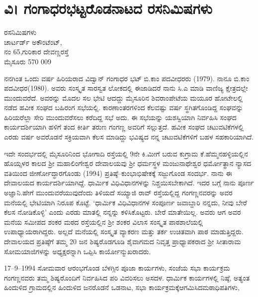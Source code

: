 \chapter{ವಿ। ಗಂಗಾಧರಭಟ್ಟರೊಡನಾಟದ ರಸನಿಮಿಷಗಳು} 

\begin{center}
\smallskip

ರಸನಿಮಿಷಗಳು\\
ಚಾರ್ಟರ್ಡ್ ಅಕೌಂಟೆಂಟ್,\\ 
ನಂ 65,ಗುರಿಕಾರ ದೇವಣ್ಣರಸ್ತೆ\\
ಮೈಸೂರು 570 009 
\addrule	
\end{center}

ನನಗಿಂತ ಒಂದು ವರ್ಷ ಹಿರಿಯರಾದ ವಿದ್ವಾನ್ ಗಂಗಾಧರ ಭಟ್ ಬಿ.ಕಾಂ ಪದವೀಧರರು (1979). ನಾನೂ ಬಿ.ಕಾಂ ಪದವೀಧರ(1980). ಅವರು ಸಂಸ್ಕೃತ ಸಾರಸ್ವತ ಲೋಕದಲ್ಲಿ ಈಜಾಡಿದರೆ ನಾನು ಸಿ.ಎ ಮಾಡಿ ವಾಣಿಜ್ಯ ಕ್ಷೇತ್ರದಲ್ಲೇ ಮುಂದುವರೆದೆ. ಅವರನ್ನು ಮೊದಲ ಸಲ ಭೇಟಿ ಆದದ್ದು ಮೈಸೂರಿನ ಶಿವರಾಂಪೇಟೆಯ ಮಯೂರ ಹೋಟೇಲಲ್ಲಿ ನಡೆದ ಹವೀಕ ಸಂಘದ ಬಹಿರಂಗ ಸಭೆಯಲ್ಲಿ. ಕಾರಣಾಂತರಗಳಿಂದ ಕೆಲವಷ್ಟು ವರ್ಷ ಸ್ಥಗಿತಗೊಂಡಿದ್ದ ಸಂಘವನ್ನು ಹಿರಿಯರೆಲ್ಲಾ ಸೇರಿ ಮುಂದುವರೆಸಲು ಕರೆದಿದ್ದ ಸಭೆ ಅದು. ಈ ಸಭೆಯನ್ನು ಯಶಸ್ವಿಯಾಗಿ ನಿರ್ವಹಿಸಿ ಸಂಘದ ಕಾರ್ಯದರ್ಶಿಯಾಗಿ ಹಳಿಗೆ ತಂದ ಕೀರ್ತಿ ತರುಣ ಗಂಗಣ್ಣ ಅವರಿಗೆ ಸಲ್ಲುತ್ತದೆ. ಹವೀಕ ಸಂಘದ ಚಟುವಟಿಕೆಗಳಲ್ಲಿ ಎರಡು ವರ್ಷ ಅವರೊಡನೆ ಸಕ್ರಿಯವಾಗಿ ಕೆಲಸ ಮಾಡಿದ್ದು ಭವಿಷ್ಯದ ನನ್ನ ಚಟುವಟಿಕೆಗಳಿಗೆ ಬಹಳ ಸಹಕಾರಿಯಾಗಿದೆ.

ಇದೇ ಸಂದರ್ಭದಲ್ಲಿ ಮೈಸೂರಿನಿಂದ ಭೋಗಾದಿ ರಸ್ತೆಯಲ್ಲಿ 9ನೇ ಕಿ.ಮೀಗೆ ಬರುವ ಕುಗ್ರಾಮ ಕೆ.ಹೆಮ್ಮನ\-ಹಳ್ಳಿಯಲ್ಲಿನ ಹೊಯ್ಸಳರ ಕಾಲದ ಶ್ರೀ ಮಹಾಲಿಂಗೇಶ್ವರ ದೇವಾಲಯವು ಶ್ರೀ ಧರ್ಮಸ್ಥಳ ಮಂಜುನಾಥೇಶ್ವರ ಧರ್ಮೋತ್ಥಾನ ನ್ಯಾಸದ ವತಿಯಿಂದ ಜೀರ್ಣೋದ್ಧಾರಗೊಂಡು (1994)    ಪ್ರತಿಷ್ಠೆ–ಕುಂಭಾಭಿಷೇಕಕ್ಕೆ ಸಜ್ಜುಗೊಂಡ ಸಂದರ್ಭ. ನಾನು ಈ ದೇವಾಲಯದ ಕಾರ್ಯದರ್ಶಿಯಾಗಿದ್ದೆ. ಧಾರ್ಮಿಕ ವಿಧಿವಿಧಾನಗಳನ್ನು  ನಿಶ್ಚಯಿಸಬೇಕಾಗಿದೆ. ಇದರ ಬಗ್ಗೆ ನಾನು ಪೂರ್ಣ ಅಜ್ಞಾನಿ.ಹೇಗೆ ಮುಂದುವರೆಯುವುದೆಂದು ತಿಳಿಯದೆ ಸಯ್ಯಾಜಿ ರಾವ್ ರಸ್ತೆಯಲ್ಲಿದ್ದ ಗಂಗಣ್ಣನವರನ್ನು ಅವರ ಮನೆಯಲ್ಲಿ ಭೇಟಿಯಾಗಿ ನಿರೂಪ ಕೊಟ್ಟೆ.  ‘ಧಾರ್ಮಿಕ ವಿಧಿವಿಧಾನಗಳ ಸಂಪೂರ್ಣ  ಜವಾಬ್ದಾರಿ ನನ್ನದು, ನೀವು ಬೇರೆ ಕೆಲಸ ನೋಡಿಕೊಳ್ಳಿ’  ಎಂದು ಎರಡು ಮಾತಲ್ಲಿ ನನ್ನನ್ನು ಕಳಿಸಿಕೊಟ್ಟರು. ಬೇರೆ ಮಾತೇಯಿಲ್ಲ. ಅವರು ಆಗ ಅವರ ಮನೆಯ ಸಮೀಪದ ಶಂಕರ ಮಠದ ರಸ್ತೆಯಲ್ಲಿನ ಶ್ರೀ ಶಂಕರ ವಿಲಾಸ ಸಂಸ್ಕೃತ ಪಾಠಶಾಲೆಯಲ್ಲಿ ಉಪಾಧ್ಯಾಯರಾಗಿದ್ದರು. ಅಲ್ಲದೆ ಮನೆಯಲ್ಲಿ ಸಂಸ್ಕೃತ ವ್ಯಾಕರಣ ಮತ್ತು ತರ್ಕ ಉಚಿತವಾಗಿ ಪಾಠ ಮಾಡುತ್ತಿದ್ದರು. ದೇವಾಲಯದ ಪ್ರತಿಷ್ಠೆಗೆ ತಮ್ಮ 20 ಜನ ಶಿಷ್ಯರೊಡಗೂಡಿ ಶೈವಾಗಮದ  ನಿವೃತ್ತ ಪ್ರಾಧ್ಯಾಪಕರಾದ ಶ್ರೀ ಸೀತಾರಾಮ ಸೋಮಯಾಜಿಗಳನ್ನು ಅಧ್ಯಕ್ಷರನ್ನಾಗಿ ಒಪ್ಪಿಸಿ ಕಾರ್ಯೋನ್ಮುಖರಾದರು. 

17–9–1994 ಸೋಮವಾರ ಆರಂಭಗೊಂಡ ಬೆಳಗ್ಗಿನ ಪೂಜಾ ಕಾರ್ಯಗಳು, ಸಂಜೆಯ ಸಭಾ ಕಾರ್ಯಕ್ರಮ ಗಂಗಣ್ಣನವರು ತಮ್ಮ ಶಿಷ್ಯರೊಂದಿಗೆ ನಿರ್ವಹಿಸಿದ ಪರಿ ವಿವರಿಸಲು ಅಸದಳ. ಧಾರ್ಮಿಕ ಕಾರ್ಯಗಳಲ್ಲಿ ನಿಷ್ಠೆ, ಅತ್ಯಂತ ಹಿಂದುಳಿದ ಗ್ರಾಮದಲ್ಲಿನ ಹಿಂದುಳಿದ ಜನರೊಡನೆ ಒಡನಾಟ, ಸಭಾ ಕಾರ್ಯಕ್ರಮಕ್ಕೆಆಗಮಿಸಿದಮಠಾಧಿಪತಿಗಳು, 
                                                                   
